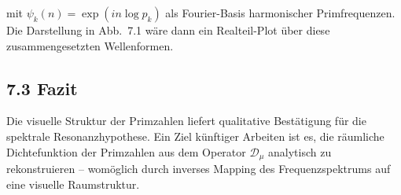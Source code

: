 \documentclass[12pt]{article}
\begin{document}
mit \(\psi_k(n) = \exp(i n \log p_k)\) als Fourier-Basis harmonischer Primfrequenzen. Die Darstellung in Abb.~7.1 wäre dann ein Realteil-Plot über diese zusammengesetzten Wellenformen.

\subsection*{7.3 Fazit}

Die visuelle Struktur der Primzahlen liefert qualitative Bestätigung für die spektrale Resonanzhypothese. Ein Ziel künftiger Arbeiten ist es, die räumliche Dichtefunktion der Primzahlen aus dem Operator \(\mathcal{D}_\mu\) analytisch zu rekonstruieren – womöglich durch inverses Mapping des Frequenzspektrums auf eine visuelle Raumstruktur.

\end{document}
